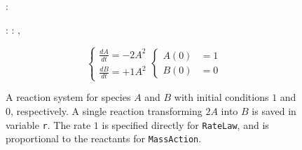 \begin{figure}[t]
\begin{minipage}[t]{\linewidth}
{\begin{minipage}[c]{0.40\linewidth}
{}

\end{minipage}%

}

\end{minipage}%
\newline
\begin{minipage}[t]{\linewidth}

{\centering 

\begin{minipage}[c]{0.60\linewidth}

{\centering 

\begin{Shaded}
\begin{Highlighting}[]
\KeywordTok{(}\KeywordTok{)}:

: \OperatorTok{=}\KeywordTok{(}\OperatorTok{=}\KeywordTok{)}
: \OperatorTok{=}\KeywordTok{(}\OperatorTok{=}\KeywordTok{)}
\OperatorTok{=}\KeywordTok{(}
\OperatorTok{=}\KeywordTok{[} \OperatorTok{*}\KeywordTok{]},
\OperatorTok{=}\NormalTok{\KeywordTok{[}B\KeywordTok{]},}
\OperatorTok{=}\NormalTok{,}
\KeywordTok{    )}
\end{Highlighting}
\end{Shaded}

}

\end{minipage}%
%
\begin{minipage}[c]{0.40\linewidth}

{\centering 

\[
\begin{cases}
    \frac{dA}{dt} = -2 A^2 \\
    \frac{dB}{dt} = +1 A^2
\end{cases}
\begin{cases}
    A(0) &= 1 \\
    B(0) &= 0
\end{cases}
\]

}

\end{minipage}%

}

\end{minipage}%

\caption{\label{fig-simbio}A reaction system for species \(A\) and \(B\)
with initial conditions \(1\) and \(0\), respectively. A single reaction
transforming \(2A\) into \(B\) is saved in variable \texttt{r}. The rate
\(1\) is specified directly for \texttt{RateLaw}, and is proportional to
the reactants for \texttt{MassAction}.}

\end{figure}
